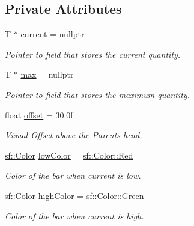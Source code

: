 \subsection*{Private Attributes}
\begin{DoxyCompactItemize}
\item 
\mbox{\label{class_overhead_bar_a7b532b8e635afbe0904b7d9b6c689e77}} 
T $\ast$ \mbox{\hyperlink{class_overhead_bar_a7b532b8e635afbe0904b7d9b6c689e77}{current}} = nullptr
\begin{DoxyCompactList}\small\item\em Pointer to field that stores the current quantity. \end{DoxyCompactList}\item 
\mbox{\label{class_overhead_bar_ab938cb28f6c4db64a6d558a61be21605}} 
T $\ast$ \mbox{\hyperlink{class_overhead_bar_ab938cb28f6c4db64a6d558a61be21605}{max}} = nullptr
\begin{DoxyCompactList}\small\item\em Pointer to field that stores the maximum quantity. \end{DoxyCompactList}\item 
\mbox{\label{class_overhead_bar_a4eb6215b278ed839b81190f3361c168c}} 
float \mbox{\hyperlink{class_overhead_bar_a4eb6215b278ed839b81190f3361c168c}{offset}} = 30.\+0f
\begin{DoxyCompactList}\small\item\em Visual Offset above the Parents head. \end{DoxyCompactList}\item 
\mbox{\label{class_overhead_bar_a93715ce920acddb4d42a14a6a31f9738}} 
\mbox{\hyperlink{classsf_1_1_color}{sf\+::\+Color}} \mbox{\hyperlink{class_overhead_bar_a93715ce920acddb4d42a14a6a31f9738}{low\+Color}} = \mbox{\hyperlink{classsf_1_1_color_a127dbf55db9c07d0fa8f4bfcbb97594a}{sf\+::\+Color\+::\+Red}}
\begin{DoxyCompactList}\small\item\em Color of the bar when current is low. \end{DoxyCompactList}\item 
\mbox{\label{class_overhead_bar_a673fb45da63995efa33b4e0c8991c809}} 
\mbox{\hyperlink{classsf_1_1_color}{sf\+::\+Color}} \mbox{\hyperlink{class_overhead_bar_a673fb45da63995efa33b4e0c8991c809}{high\+Color}} = \mbox{\hyperlink{classsf_1_1_color_a95629b30de8c6856aa7d3afed12eb865}{sf\+::\+Color\+::\+Green}}
\begin{DoxyCompactList}\small\item\em Color of the bar when current is high. \end{DoxyCompactList}\end{DoxyCompactItemize}
